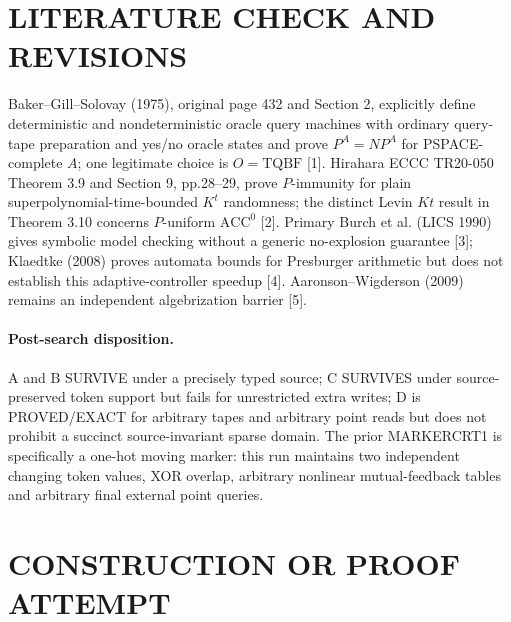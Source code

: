\documentclass[11pt]{article}
\begin{document}
\section{LITERATURE CHECK AND REVISIONS}
Baker--Gill--Solovay (1975), original page 432 and Section 2, explicitly define deterministic and nondeterministic oracle query machines with ordinary query-tape preparation and yes/no oracle states and prove $P^A=NP^A$ for PSPACE-complete $A$; one legitimate choice is $O=\mathrm{TQBF}$ [1]. Hirahara ECCC TR20-050 Theorem 3.9 and Section 9, pp.28--29, prove $P$-immunity for plain superpolynomial-time-bounded $K^t$ randomness; the distinct Levin $Kt$ result in Theorem 3.10 concerns $P$-uniform $\mathrm{ACC}^0$ [2]. Primary Burch et al. (LICS 1990) gives symbolic model checking without a generic no-explosion guarantee [3]; Klaedtke (2008) proves automata bounds for Presburger arithmetic but does not establish this adaptive-controller speedup [4]. Aaronson--Wigderson (2009) remains an independent algebrization barrier [5].
\paragraph{Post-search disposition.} A and B SURVIVE under a precisely typed source; C SURVIVES under source-preserved token support but fails for unrestricted extra writes; D is PROVED/EXACT for arbitrary tapes and arbitrary point reads but does not prohibit a succinct source-invariant sparse domain. The prior MARKERCRT1 is specifically a one-hot moving marker: this run maintains two independent changing token values, XOR overlap, arbitrary nonlinear mutual-feedback tables and arbitrary final external point queries.
\section{CONSTRUCTION OR PROOF ATTEMPT}
\end{document}
